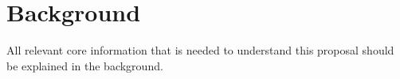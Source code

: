 \section*{Background}\label{ch:background}

All relevant core information that is needed to understand this proposal should be explained in the background.
